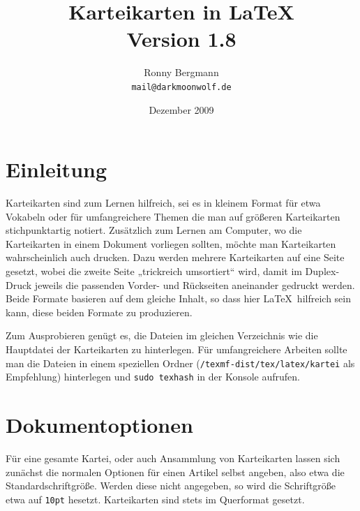 \documentclass[a4paper,DIV=calc]{scrartcl}
\begin{document}
\title{Karteikarten in \LaTeX\\{\large Version 1.8}}
\author{Ronny Bergmann\\\texttt{mail@darkmoonwolf.de}}
\date{Dezember 2009}
\maketitle
\section{Einleitung}
Karteikarten sind zum Lernen hilfreich, sei es in kleinem Format für etwa Vokabeln oder für umfangreichere Themen die man auf größeren Karteikarten stichpunktartig notiert. Zusätzlich zum Lernen am Computer, wo die Karteikarten in einem Dokument vorliegen sollten, möchte man Karteikarten wahrscheinlich auch drucken. Dazu werden mehrere Karteikarten auf eine Seite gesetzt, wobei die zweite Seite „trickreich umsortiert“ wird, damit im Duplex-Druck jeweils die passenden Vorder- und Rückseiten aneinander gedruckt werden. Beide Formate basieren auf dem gleiche Inhalt, so dass hier \LaTeX\ hilfreich sein kann, diese beiden Formate zu produzieren.

Zum Ausprobieren genügt es, die Dateien im gleichen Verzeichnis wie die Hauptdatei der Karteikarten zu hinterlegen. Für umfangreichere Arbeiten sollte man die Dateien in einem speziellen Ordner (\lstinline!/texmf-dist/tex/latex/kartei! als Empfehlung) hinterlegen und \lstinline!sudo texhash! in der Konsole aufrufen.

\section{Dokumentoptionen}
Für eine gesamte Kartei, oder auch Ansammlung von Karteikarten lassen sich zunächst die normalen Optionen für einen Artikel selbst angeben, also etwa die Standardschriftgröße. Werden diese nicht angegeben, so wird die Schriftgröße etwa auf \lstinline!10pt! hesetzt. Karteikarten sind stets im Querformat gesetzt.
\end{document}
